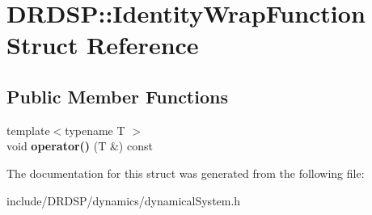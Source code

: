 \hypertarget{struct_d_r_d_s_p_1_1_identity_wrap_function}{\section{D\-R\-D\-S\-P\-:\-:Identity\-Wrap\-Function Struct Reference}
\label{struct_d_r_d_s_p_1_1_identity_wrap_function}
}
\subsection*{Public Member Functions}
\begin{DoxyCompactItemize}
\item 
\hypertarget{struct_d_r_d_s_p_1_1_identity_wrap_function_a3ad8e117a048d95b1c5911a4a1f1305b}{{\footnotesize template$<$typename T $>$ }\\void {\bfseries operator()} (T \&) const }\label{struct_d_r_d_s_p_1_1_identity_wrap_function_a3ad8e117a048d95b1c5911a4a1f1305b}

\end{DoxyCompactItemize}


The documentation for this struct was generated from the following file\-:\begin{DoxyCompactItemize}
\item 
include/\-D\-R\-D\-S\-P/dynamics/dynamical\-System.\-h\end{DoxyCompactItemize}
